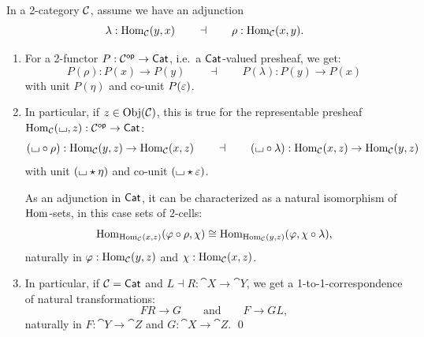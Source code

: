 \documentclass[a4paper]{memoir}
\begin{document}
\begin{corollary} \label{thm:adjunctions-under-op}
	In a 2-category ${\mathcal{C}}$, assume we have an adjunction
	\[
		\lambda : {\mathrm{Hom}}_{\mathcal{C}}(y, x)
		\qquad \dashv \qquad
		\rho : {\mathrm{Hom}}_{\mathcal{C}}(x, y).
	\]
	\begin{enumerate}
		\item For a 2-functor $P : {\mathcal{C}}^{\mathsf{op}} \to {\mathsf{Cat}}$, i.e.\ a ${\mathsf{Cat}}$-valued presheaf, we get:
		\[
			P(\rho) : P(x) \to P(y)
			\qquad \dashv \qquad
			P(\lambda) : P(y) \to P(x)
		\]
		with unit $P(\eta)$ and co-unit $P(\varepsilon)$.
		
		\item In particular, if $z \in \mathrm{Obj}({\mathcal{C}})$, this is true for the representable presheaf ${\mathrm{Hom}}_{\mathcal{C}}({\llcorner\hspace{-.4ex}\lrcorner}, z) : {\mathcal{C}}^{\mathsf{op}} \to {\mathsf{Cat}}$:
		\[
			({\llcorner\hspace{-.4ex}\lrcorner} \circ \rho) : {\mathrm{Hom}}_{\mathcal{C}}(y, z) \to {\mathrm{Hom}}_{\mathcal{C}}(x, z)
			\qquad \dashv \qquad
			({\llcorner\hspace{-.4ex}\lrcorner} \circ \lambda) : {\mathrm{Hom}}_{\mathcal{C}}(x, z) \to {\mathrm{Hom}}_{\mathcal{C}}(y, z)
		\]
		with unit $({\llcorner\hspace{-.4ex}\lrcorner} \star \eta)$ and co-unit $({\llcorner\hspace{-.4ex}\lrcorner} \star \varepsilon)$.
		
		As an adjunction in ${\mathsf{Cat}}$, it can be characterized as a natural isomorphism of ${\mathrm{Hom}}$-sets, in this case sets of 2-cells:
		\[
			{\mathrm{Hom}}_{{\mathrm{Hom}}_{\mathcal{C}}(x, z)}(\varphi \circ \rho, \chi) \cong
			{\mathrm{Hom}}_{{\mathrm{Hom}}_{\mathcal{C}}(y, z)}(\varphi, \chi \circ \lambda),
		\]
		naturally in $\varphi : {\mathrm{Hom}}_{\mathcal{C}}(y, z)$ and $\chi : {\mathrm{Hom}}_{\mathcal{C}}(x, z)$.
		
		\item In particular, if ${\mathcal{C}} = {\mathsf{Cat}}$ and $L \dashv R : \cat X \to \cat Y$, we get a 1-to-1-correspondence of natural transformations:
		\[
			FR \to G \qquad \text{and} \qquad F \to GL,
		\]
		naturally in $F : \cat Y \to \cat Z$ and $G : \cat X \to \cat Z$.
		\qed
	\end{enumerate}
\end{corollary}
\end{document}
